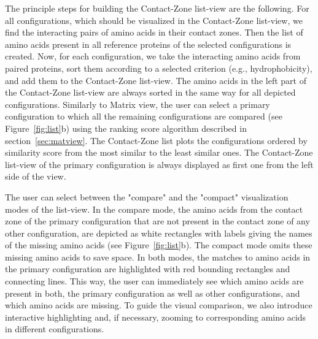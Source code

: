 \documentclass{bmcart}
\def\MatView {Matrix view\xspace}
\def\CoZoListView {Contact-Zone list-view\xspace}
\def\CoZoList{Contact-Zone list\xspace}
\begin{document}
The principle steps for building the \CoZoListView are the following.
For all configurations, which should be visualized in the \CoZoListView, we find the interacting pairs of amino acids in their contact zones.
Then the list of amino acids present in all reference proteins of the selected configurations is created.
Now, for each configuration, we take the interacting amino acids from paired proteins, sort them according to a selected criterion (e.g., hydrophobicity), and add them to the \CoZoListView.
The amino acids in the left part of the \CoZoListView are always sorted in the same way for all depicted configurations.
Similarly to \MatView, the user can select a primary configuration to which all the remaining configurations are compared (see Figure~\ref{fig:list}b) using the ranking score algorithm described in section~\ref{sec:matview}.
The \CoZoList plots the configurations ordered by similarity score from the most similar to the least similar ones.
The \CoZoListView of the primary configuration is always displayed as first one from the left side of the view.

The user can select between the "compare" and the "compact" visualization modes of the list-view.
In the compare mode, the amino acids from the contact zone of the primary configuration that are not present in the contact zone of any other configuration, are depicted as white rectangles with labels giving the names of the missing amino acids (see Figure~\ref{fig:list}b).
The compact mode omits these missing amino acids to save space.
In both modes, the matches to amino acids in the primary configuration are highlighted with red bounding rectangles and connecting lines.
This way, the user can immediately see which amino acids are present in both, the primary configuration as well as other configurations, and which amino acids are missing.
To guide the visual comparison, we also introduce interactive highlighting and, if necessary, zooming to corresponding amino acids in different configurations.

\end{document}
